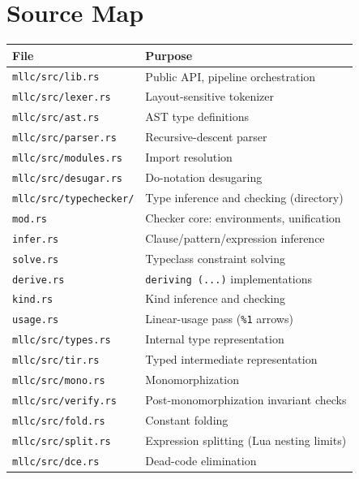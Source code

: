\documentclass[11pt,a4paper]{article}
\begin{document}
\section{Source Map}

\begin{tabular}{@{}ll@{}}
\toprule
\textbf{File} & \textbf{Purpose} \\
\midrule
\texttt{mllc/src/lib.rs}          & Public API, pipeline orchestration \\
\texttt{mllc/src/lexer.rs}        & Layout-sensitive tokenizer \\
\texttt{mllc/src/ast.rs}          & AST type definitions \\
\texttt{mllc/src/parser.rs}       & Recursive-descent parser \\
\texttt{mllc/src/modules.rs}      & Import resolution \\
\texttt{mllc/src/desugar.rs}      & Do-notation desugaring \\
\texttt{mllc/src/typechecker/}    & Type inference and checking (directory) \\
\quad \texttt{mod.rs}             & Checker core: environments, unification \\
\quad \texttt{infer.rs}           & Clause/pattern/expression inference \\
\quad \texttt{solve.rs}           & Typeclass constraint solving \\
\quad \texttt{derive.rs}          & \texttt{deriving (...)} implementations \\
\quad \texttt{kind.rs}            & Kind inference and checking \\
\quad \texttt{usage.rs}           & Linear-usage pass (\texttt{\%1} arrows) \\
\texttt{mllc/src/types.rs}        & Internal type representation \\
\texttt{mllc/src/tir.rs}          & Typed intermediate representation \\
\texttt{mllc/src/mono.rs}         & Monomorphization \\
\texttt{mllc/src/verify.rs}       & Post-monomorphization invariant checks \\
\texttt{mllc/src/fold.rs}         & Constant folding \\
\texttt{mllc/src/split.rs}        & Expression splitting (Lua nesting limits) \\
\texttt{mllc/src/dce.rs}          & Dead-code elimination \\

\end{tabular}
\end{document}
